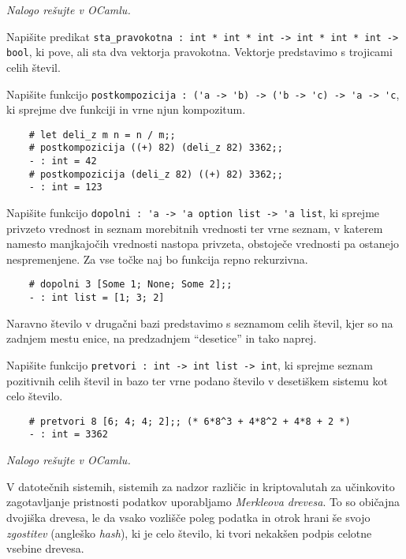 \documentclass[arhiv]{../izpit}
\begin{document}
	


\naloga

\emph{Nalogo rešujte v OCamlu.}

\podnaloga
  Napišite predikat \verb|sta_pravokotna : int * int * int -> int * int * int -> bool|, ki pove, ali sta dva vektorja pravokotna. Vektorje predstavimo s trojicami celih števil.

\podnaloga
  Napišite funkcijo \verb|postkompozicija : ('a -> 'b) -> ('b -> 'c) -> 'a -> 'c|, ki sprejme dve funkciji in vrne njun kompozitum.
  \begin{verbatim}
    # let deli_z m n = n / m;;
    # postkompozicija ((+) 82) (deli_z 82) 3362;;
    - : int = 42
    # postkompozicija (deli_z 82) ((+) 82) 3362;;
    - : int = 123
  \end{verbatim}

\podnaloga
  Napišite funkcijo \verb|dopolni : 'a -> 'a option list -> 'a list|, ki sprejme privzeto vrednost in seznam morebitnih vrednosti ter vrne seznam, v katerem namesto manjkajočih vrednosti nastopa privzeta, obstoječe vrednosti pa ostanejo nespremenjene. Za vse točke naj bo funkcija repno rekurzivna.
  \begin{verbatim}
    # dopolni 3 [Some 1; None; Some 2];;
    - : int list = [1; 3; 2]
  \end{verbatim}

\podnaloga
  Naravno število v drugačni bazi predstavimo s seznamom celih števil, kjer so na zadnjem mestu enice, na predzadnjem ``desetice'' in tako naprej.
  
  Napišite funkcijo \verb|pretvori : int -> int list -> int|, ki sprejme seznam pozitivnih celih števil in bazo ter vrne podano število v desetiškem sistemu kot celo število.
  \begin{verbatim}
    # pretvori 8 [6; 4; 4; 2];; (* 6*8^3 + 4*8^2 + 4*8 + 2 *)
    - : int = 3362
  \end{verbatim}


\naloga

\emph{Nalogo rešujte v OCamlu.}

\noindent
V datotečnih sistemih, sistemih za nadzor različic in kriptovalutah za učinkovito zagotavljanje pristnosti podatkov uporabljamo \emph{Merkleova drevesa}. To so običajna dvojiška drevesa, le da vsako vozlišče poleg podatka in otrok hrani še svojo \emph{zgostitev} (angleško \emph{hash}), ki je celo število, ki tvori nekakšen podpis celotne vsebine drevesa.
\end{document}
